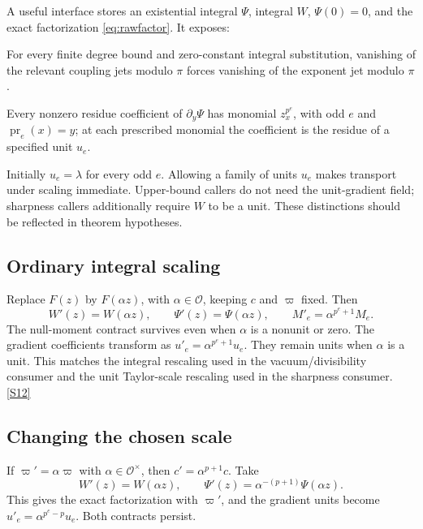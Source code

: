 \documentclass[11pt,letterpaper]{article}
\theoremstyle{remark}
\newcommand{\OO}{\mathcal O}
\newcommand{\src}[1]{\hyperref[src:#1]{[S#1]}}
\begin{document}
A useful interface stores an existential integral \(\Psi\), integral \(W\),
\(\Psi(0)=0\), and the exact factorization \eqref{eq:rawfactor}. It exposes:
\begin{description}[style=nextline,leftmargin=0pt,labelwidth=0pt,labelsep=0pt]
\item[Null-moment contract.]
For every finite degree bound and zero-constant integral substitution, vanishing
of the relevant coupling jets modulo \(\pi\) forces vanishing of the exponent
jet modulo \(\pi\).
\item[Inert gradient contract.]
Every nonzero residue coefficient of \(\partial_y\Psi\) has monomial
\(z_x^{p^e}\), with odd \(e\) and \(\operatorname{pr}_e(x)=y\); at each
prescribed monomial the coefficient is the residue of a specified unit \(u_e\).
\end{description}
Initially \(u_e=\lambda\) for every odd \(e\). Allowing a family of units
\(u_e\) makes transport under scaling immediate. Upper-bound callers do not
need the unit-gradient field; sharpness callers additionally require \(W\) to
be a unit. These distinctions should be reflected in theorem hypotheses.

\subsection{Ordinary integral scaling}

Replace \(F(z)\) by \(F(\alpha z)\), with \(\alpha\in\OO\), keeping
\(c\) and \(\varpi\) fixed. Then
\[
 W'(z)=W(\alpha z),\qquad \Psi'(z)=\Psi(\alpha z),\qquad
 M'_e=\alpha^{p^e+1}M_e.
\]
The null-moment contract survives even when \(\alpha\) is a nonunit or zero.
The gradient coefficients transform as
\(u'_e=\alpha^{p^e+1}u_e\). They remain units when \(\alpha\) is a unit.
This matches the integral rescaling used in the vacuum/divisibility consumer
and the unit Taylor-scale rescaling used in the sharpness consumer. \src{12}

\subsection{Changing the chosen scale}

If \(\varpi'=\alpha\varpi\) with \(\alpha\in\OO^\times\), then
\(c'=\alpha^{p+1}c\). Take
\[
 W'(z)=W(\alpha z),\qquad
 \Psi'(z)=\alpha^{-(p+1)}\Psi(\alpha z).
\]
This gives the exact factorization with \(\varpi'\), and the gradient units
become \(u'_e=\alpha^{p^e-p}u_e\). Both contracts persist.
\end{document}
